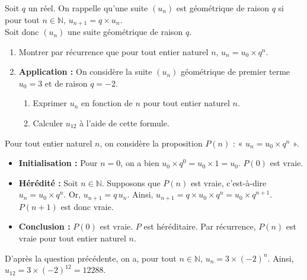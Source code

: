 \documentclass[11pt,fleqn]{book} %
\begin{document}
\begin{exercise}
Soit $q$ un réel. On rappelle qu'une suite $(u_n)$ est géométrique de raison $q$ si pour tout $n\in\mathbb{N}$, $u_{n+1}=q\times u_n$. \\Soit donc $(u_n)$ une suite géométrique de raison $q$.
\begin{enumerate}
\item Montrer par récurrence que pour tout entier naturel $n$, $u_n=u_0 \times q^n$.
\item \textbf{Application :} On considère la suite $(u_n)$ géométrique de premier terme $u_0=3$ et de raison $q=-2$.
\begin{enumerate}
\item Exprimer $u_n$ en fonction de $n$ pour tout entier naturel $n$.
\item Calculer $u_{12}$ à l'aide de cette formule.
\end{enumerate}
\end{enumerate}\end{exercise}
\begin{solution}Pour tout entier naturel $n$, on considère la proposition $P(n)$ : « $u_n=u_0 \times q^n $ ».
\begin{itemize}
\item \textbf{Initialisation :} Pour $n=0$, on a bien $u_0 \times q^0=u_0 \times 1 = u_0$. $P(0)$ est vraie.
\item \textbf{Hérédité :} Soit $n\in\mathbb{N}$. Supposons que $P(n)$ est vraie, c'est-à-dire $u_n=u_0 \times q^n$. Or, $u_{n+1}=q\,u_n$. Ainsi, $u_{n+1}=q \times u_0 \times q^n=u_0 \times q^{n+1}$. $P(n+1)$ est donc vraie.
\item \textbf{Conclusion :} $P(0)$ est vraie. $P$ est héréditaire. Par récurrence, $P(n)$ est vraie pour tout entier naturel $n$.
\end{itemize}

D'après la question précédente, on a, pour tout  $n\in\mathbb{N}$, $u_n=3 \times (-2)^n$. Ainsi, $u_{12}=3 \times (-2)^{12}=12288$.\end{solution}
\end{document}
